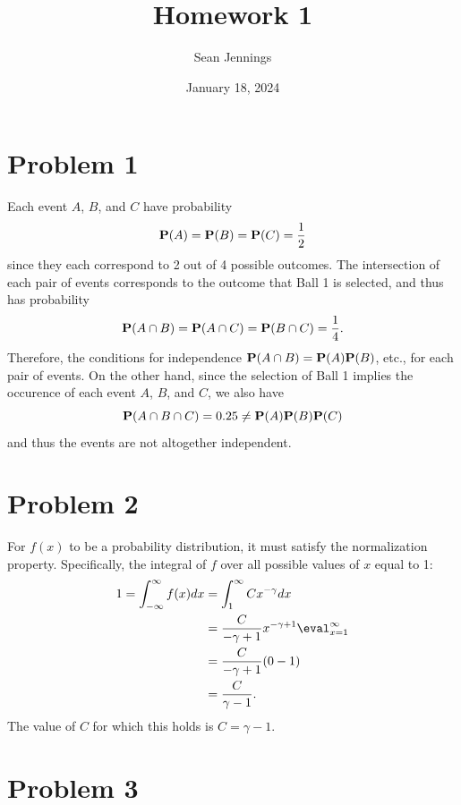 \documentclass{homework}
\title{Homework 1}
\author{Sean Jennings}
\date{January 18, 2024}
\begin{document}
\maketitle

\section{Problem 1}
Each event $A$, $B$, and $C$ have probability
\begin{equation*}
    {\bf P}(A) = {\bf P}(B) = {\bf P}(C) = \frac{1}{2}
\end{equation*}
since they each correspond to 2 out of 4 possible outcomes. The 
intersection of each pair of events corresponds to the outcome
that Ball 1 is selected, and thus has probability
\begin{equation*}
    {\bf P}(A \cap B) = {\bf P}(A \cap C) = {\bf P}(B \cap C) = \frac{1}{4}.
\end{equation*}
Therefore, the conditions for independence
${\bf P}(A \cap B) = {\bf P}(A) {\bf P}(B)$, etc., for each pair of 
events. On the other hand, since the selection of Ball 1 implies the
occurence of each event $A$, $B$, and $C$, we also have
\begin{equation*}
    {\bf P}(A \cap B \cap C) = 0.25 \neq {\bf P}(A) {\bf P}(B) {\bf P}(C)
\end{equation*}
and thus the events are not altogether independent.

\section{Problem 2}

For $f(x)$ to be a probability distribution, it must satisfy the normalization
property. Specifically, the integral
of $f$ over all possible values of $x$ equal to 1:
\begin{align*}
    1= \int_{-\infty}^{\infty} f(x)dx &= \int_{1}^{\infty} Cx^{-\gamma} dx \\
        &= \frac{C}{-\gamma + 1} x^{-\gamma + 1} \eval_{x=1}^{\infty} \\
        &= \frac{C}{-\gamma + 1} (0 - 1) \\
        &= \frac{C}{\gamma - 1}.
\end{align*}
The value of $C$ for which this holds is $C = \gamma - 1$.

\section{Problem 3}
\end{document}
